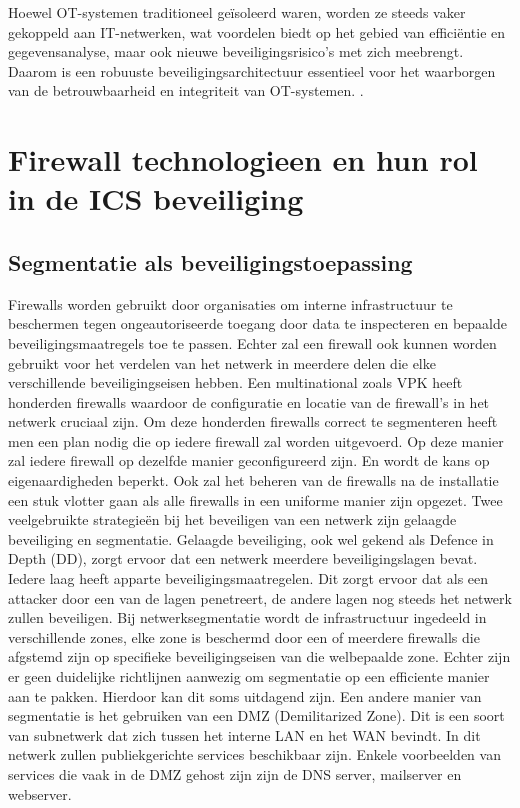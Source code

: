 Hoewel OT-systemen traditioneel geïsoleerd waren, worden ze steeds vaker gekoppeld aan IT-netwerken, wat voordelen biedt op het gebied van efficiëntie en gegevensanalyse, maar ook nieuwe beveiligingsrisico’s met zich meebrengt. Daarom is een robuuste beveiligingsarchitectuur essentieel voor het waarborgen van de betrouwbaarheid en integriteit van OT-systemen. \autocite{Stouffer2023}.

\section{Firewall technologieen en hun rol in de ICS beveiliging}

\subsection{Segmentatie als beveiligingstoepassing}
Firewalls worden gebruikt door organisaties om interne infrastructuur te beschermen tegen ongeautoriseerde toegang door data te inspecteren en bepaalde beveiligingsmaatregels toe te passen. Echter zal een firewall ook kunnen worden gebruikt voor het verdelen van het netwerk in meerdere delen die elke verschillende beveiligingseisen hebben. Een multinational zoals VPK heeft honderden firewalls waardoor de configuratie en locatie van de firewall’s in het netwerk cruciaal zijn. Om deze honderden firewalls correct te segmenteren heeft men een plan nodig die op iedere firewall zal worden uitgevoerd. Op deze manier zal iedere firewall op dezelfde manier geconfigureerd zijn. En wordt de kans op eigenaardigheden beperkt. Ook zal het beheren van de firewalls na de installatie een stuk vlotter gaan als alle firewalls in een uniforme manier zijn opgezet.
Twee veelgebruikte strategieën bij het beveiligen van een netwerk zijn gelaagde beveiliging en segmentatie. Gelaagde beveiliging, ook wel gekend als Defence in Depth (DD), zorgt ervoor dat een netwerk meerdere beveiligingslagen bevat. Iedere laag heeft apparte beveiligingsmaatregelen. Dit zorgt ervoor dat als een attacker door een van de lagen penetreert, de andere lagen nog steeds het netwerk zullen beveiligen. \autocite{FortinetDE2025} Bij netwerksegmentatie wordt de infrastructuur ingedeeld in verschillende zones, elke zone is beschermd door een of meerdere firewalls die afgstemd zijn op specifieke beveiligingseisen van die welbepaalde zone. Echter zijn er geen duidelijke richtlijnen aanwezig om segmentatie op een efficiente manier aan te pakken. Hierdoor kan dit soms uitdagend zijn. \autocite{Mhaskar2021}
Een andere manier van segmentatie is het gebruiken van een DMZ (Demilitarized Zone). Dit is een soort van subnetwerk dat zich tussen het interne LAN en het WAN bevindt. In dit netwerk zullen publiekgerichte services beschikbaar zijn. Enkele voorbeelden van services die vaak in de DMZ gehost zijn zijn de DNS server, mailserver en webserver. \autocite{Patel2020}



